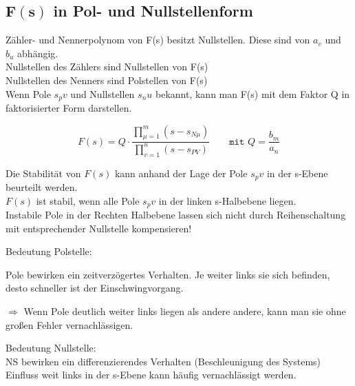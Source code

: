 \documentclass[10pt,a4paper]{article}
\begin{document}
\subsection{$\mathbf{F(s)}$ in Pol- und Nullstellenform}
\begin{mdframed}[style=exercise]
	Zähler- und Nennerpolynom von F(s) besitzt Nullstellen. Diese sind von
	$a_v$ und $b_u$ abhängig.\\
	Nullstellen des Zählers sind Nullstellen von F(s)\\
	Nullstellen des Nenners sind Polstellen von F(s)\\
	Wenn Pole $s_pv$ und Nullstellen $s_nu$ bekannt, kann man F(s) mit dem
	Faktor Q in faktorisierter Form darstellen.
\end{mdframed}

\[
	F(s)=Q \cdot \frac{\prod_{\mu=1}^{m}\left(s-s_{N \mu}\right)}{\prod_{v=1}^{n}\left(s-s_{P V}\right)}
	\qquad \texttt{mit } Q = \frac{b_m}{a_n}
\]

\begin{mdframed}[style=exercise]
	Die Stabilität von $F(s)$ kann anhand der Lage der Pole $s_pv$ in der s-Ebene
	beurteilt werden.\\ $F(s)$ ist stabil, wenn alle Pole $s_pv$ in der linken
	s-Halbebene liegen.\\ Instabile Pole in der Rechten Halbebene lassen sich
	nicht durch Reihenschaltung mit entsprechender Nullstelle kompensieren!
\end{mdframed}
\begin{mdframed}[style=exercise]
	Bedeutung Polstelle:

	Pole bewirken ein zeitverzögertes Verhalten. Je weiter links sie sich befinden,
	desto schneller ist der Einschwingvorgang.

	$\Rightarrow$ Wenn Pole deutlich weiter links liegen als andere andere, kann man sie ohne
	großen Fehler vernachlässigen.
\end{mdframed}
\begin{mdframed}[style=exercise]
	Bedeutung Nullstelle:\\
	NS bewirken ein differenzierendes Verhalten (Beschleunigung des Systems)
	Einfluss weit links in der s-Ebene kann häufig vernachlässigt werden.

\end{mdframed}
\end{document}
